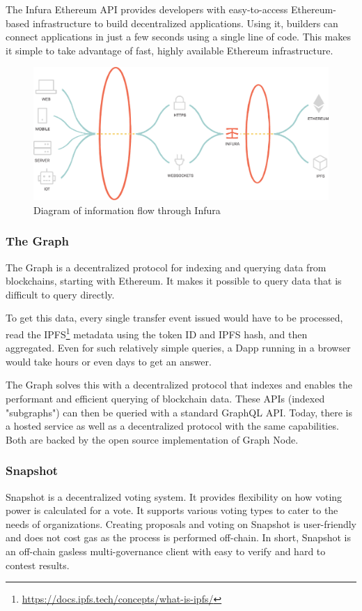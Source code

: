 \documentclass[MSE,Master,english]{twbook}%
\begin{document}
The Infura Ethereum API provides developers with easy-to-access Ethereum-based infrastructure to build decentralized applications. Using it, builders can connect applications in just a few seconds using a single line of code. This makes it simple to take advantage of fast, highly available Ethereum infrastructure. 

\begin{figure}[H]
  \centering
  \includegraphics[width=\textwidth]{infura.png}
  \caption{Diagram of information flow through Infura \cite{infura}}
  \label{fig:infura}
\end{figure}

\subsubsection{The Graph}
The Graph\cite{thegraph} is a decentralized protocol for indexing and querying data from blockchains, starting with Ethereum. It makes it possible to query data that is difficult to query directly.

To get this data, every single transfer event issued would have to be processed, read the IPFS\footnote{\url{https://docs.ipfs.tech/concepts/what-is-ipfs/}} metadata using the token ID and IPFS hash, and then aggregated. Even for such relatively simple queries, a \ac{Dapp} running in a browser would take hours or even days to get an answer.

The Graph solves this with a decentralized protocol that indexes and enables the performant and efficient querying of blockchain data. These APIs (indexed "subgraphs") can then be queried with a standard GraphQL API. Today, there is a hosted service as well as a decentralized protocol with the same capabilities. Both are backed by the open source implementation of Graph Node.

\subsubsection{Snapshot}
Snapshot\cite{snapshot} is a decentralized voting system. It provides flexibility on how voting power is calculated for a vote. It supports various voting types to cater to the needs of organizations. Creating proposals and voting on Snapshot is user-friendly and does not cost gas as the process is performed off-chain.
In short, Snapshot is an off-chain gasless multi-governance client with easy to verify and hard to contest results.  \\
\end{document}
